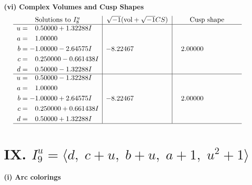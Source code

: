 \documentclass[1p]{elsarticle_modified}
\theoremstyle{definition}
\newcommand{\I}{\sqrt{-1}}
\begin{document}
\newpage\flushleft \textbf{(vi) Complex Volumes and Cusp Shapes}
$$\begin{array}{c|c|c}  
\text{Solutions to }I^u_{8}& \I (\text{vol} + \sqrt{-1}CS) & \text{Cusp shape}\\
 \hline 
\begin{aligned}
u &= \phantom{-}0.50000 + 1.32288 I \\
a &= \phantom{-}1.00000\phantom{ +0.000000I} \\
b &= -1.00000 - 2.64575 I \\
c &= \phantom{-}0.250000 - 0.661438 I \\
d &= \phantom{-}0.50000 - 1.32288 I\end{aligned}
 & -8.22467\phantom{ +0.000000I} & \phantom{-}2.00000\phantom{ +0.000000I} \\ \hline\begin{aligned}
u &= \phantom{-}0.50000 - 1.32288 I \\
a &= \phantom{-}1.00000\phantom{ +0.000000I} \\
b &= -1.00000 + 2.64575 I \\
c &= \phantom{-}0.250000 + 0.661438 I \\
d &= \phantom{-}0.50000 + 1.32288 I\end{aligned}
 & -8.22467\phantom{ +0.000000I} & \phantom{-}2.00000\phantom{ +0.000000I}\\
 \hline 
 \end{array}$$\newpage\newpage\renewcommand{\arraystretch}{1}
\centering \section*{IX. $I^u_{9}= \langle d,\;c+u,\;b+u,\;a+1,\;u^2+1 \rangle$}
\flushleft \textbf{(i) Arc colorings}\\
\end{document}
